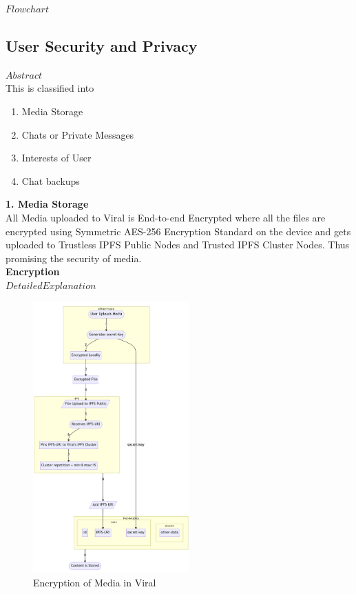 \documentclass[10pt]{article}
\begin{document}
$Flow chart$

\subsection{User Security and Privacy}

$Abstract$\\

This is classified into\\
\begin{enumerate}[leftmargin=+0.2in]
\item Media Storage
\item Chats or Private Messages
\item Interests of User
\item Chat backups
\end{enumerate}

\textbf{1. Media Storage}\\

All Media uploaded to Viral is End-to-end Encrypted where all the files are encrypted using Symmetric AES-256 Encryption Standard on the device and gets uploaded to Trustless IPFS Public Nodes and Trusted IPFS Cluster Nodes. Thus promising the security of media.\\

\textbf{Encryption}\\

$Detailed Explanation$\\


\begin{figure}[H]
\begin{center}
\includegraphics[width=6cm]{encryption}
\caption{Encryption of Media in Viral}
\end{center}
\end{figure}
\end{document}
